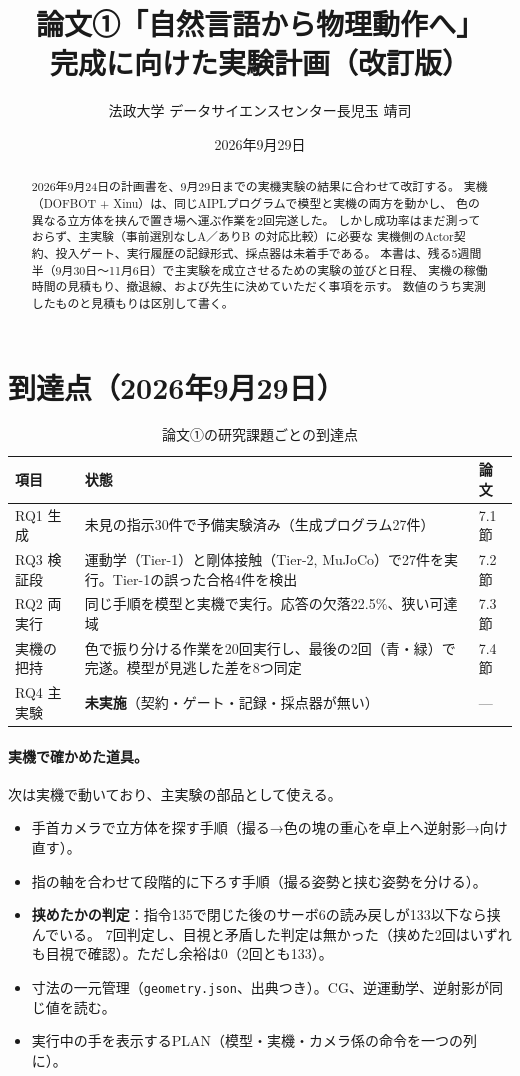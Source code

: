 \documentclass[11pt,a4paper]{article}
\title{\vspace{-12mm}\bfseries 論文①「自然言語から物理動作へ」\\[2mm]
\large 完成に向けた実験計画（改訂版）}
\author{法政大学 データサイエンスセンター長\quad 児玉 靖司}
\date{2026年9月29日}
\begin{document}
\maketitle
\thispagestyle{fancy}

\begin{abstract}
\noindent
2026年9月24日の計画書を、9月29日までの実機実験の結果に合わせて改訂する。
実機（DOFBOT + Xinu）は、同じAIPLプログラムで模型と実機の両方を動かし、
色の異なる立方体を挟んで置き場へ運ぶ作業を2回完遂した。
しかし成功率はまだ測っておらず、主実験（事前選別なしA／ありB の対応比較）に必要な
実機側のActor契約、投入ゲート、実行履歴の記録形式、採点器は未着手である。
本書は、残る5週間半（9月30日〜11月6日）で主実験を成立させるための実験の並びと日程、
実機の稼働時間の見積もり、撤退線、および先生に決めていただく事項を示す。
数値のうち実測したものと見積もりは区別して書く。
\end{abstract}

\section{到達点（2026年9月29日）}

\begin{table}[h]\centering\small
\caption{論文①の研究課題ごとの到達点}
\begin{tabularx}{\textwidth}{@{}lYl@{}}
\toprule
項目 & 状態 & 論文 \\
\midrule
RQ1 生成 & 未見の指示30件で予備実験済み（生成プログラム27件） & 7.1節 \\
RQ3 検証段 & 運動学（Tier-1）と剛体接触（Tier-2, MuJoCo）で27件を実行。Tier-1の誤った合格4件を検出 & 7.2節 \\
RQ2 両実行 & 同じ手順を模型と実機で実行。応答の欠落22.5\%、狭い可達域 & 7.3節 \\
実機の把持 & 色で振り分ける作業を20回実行し、最後の2回（青・緑）で完遂。模型が見逃した差を8つ同定 & 7.4節 \\
RQ4 主実験 & \textbf{未実施}（契約・ゲート・記録・採点器が無い） & --- \\
\bottomrule
\end{tabularx}
\end{table}

\paragraph{実機で確かめた道具。}次は実機で動いており、主実験の部品として使える。
\begin{itemize}
\item 手首カメラで立方体を探す手順（撮る→色の塊の重心を卓上へ逆射影→向け直す）。
\item 指の軸を合わせて段階的に下ろす手順（撮る姿勢と挟む姿勢を分ける）。
\item \textbf{挟めたかの判定}：指令135で閉じた後のサーボ6の読み戻しが133以下なら挟んでいる。
7回判定し、目視と矛盾した判定は無かった（挟めた2回はいずれも目視で確認）。ただし余裕は0（2回とも133）。
\item 寸法の一元管理（\texttt{geometry.json}、出典つき）。CG、逆運動学、逆射影が同じ値を読む。
\item 実行中の手を表示するPLAN（模型・実機・カメラ係の命令を一つの列に）。
\end{itemize}
\end{document}
